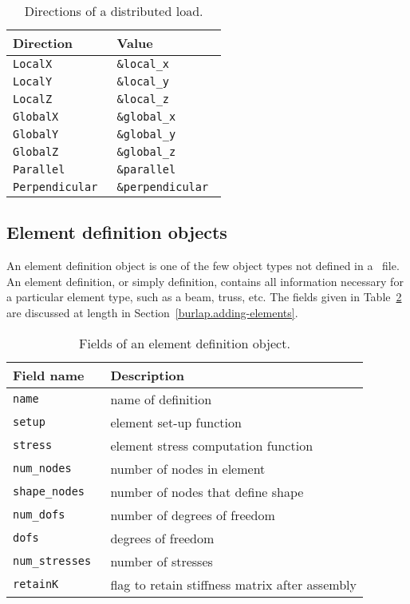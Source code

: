 {\scriptsize
\begin{table}[htbp]
\begin{center}
\begin{tabular}{l|l}
Direction		& Value			\\
\hline
\tt LocalX		& \tt \&local\_x	\\
\tt LocalY		& \tt \&local\_y	\\
\tt LocalZ		& \tt \&local\_z	\\
\tt GlobalX		& \tt \&global\_x	\\
\tt GlobalY		& \tt \&global\_y	\\
\tt GlobalZ		& \tt \&global\_z	\\
\tt Parallel		& \tt \&parallel	\\
\tt Perpendicular	& \tt \&perpendicular	\\
\end{tabular}
\caption{Directions of a distributed load.}
\label{burlap.load.directions}
\end{center}
\end{table}}


\subsection{Element definition objects}

An element definition object is one of the few object types not
defined in a \felt\ file.  An element definition, or simply
definition, contains all information necessary for a particular
element type, such as a beam, truss, etc.  The fields given in
Table~\ref{burlap.definition.fields} are discussed at length in
Section~\ref{burlap.adding-elements}.

{\scriptsize
\begin{table}[htbp]
\begin{center}
\begin{tabular}{l|l}
Field name		& Description					\\
\hline
\tt name		& name of definition				\\
\tt setup		& element set-up function			\\
\tt stress		& element stress computation function		\\
\tt num\_nodes		& number of nodes in element			\\
\tt shape\_nodes	& number of nodes that define shape		\\
\tt num\_dofs		& number of degrees of freedom			\\
\tt dofs		& degrees of freedom				\\
\tt num\_stresses	& number of stresses				\\
\tt retainK		& flag to retain stiffness matrix after assembly\\
\end{tabular}
\caption{Fields of an element definition object.}
\label{burlap.definition.fields}
\end{center}
\end{table}}


